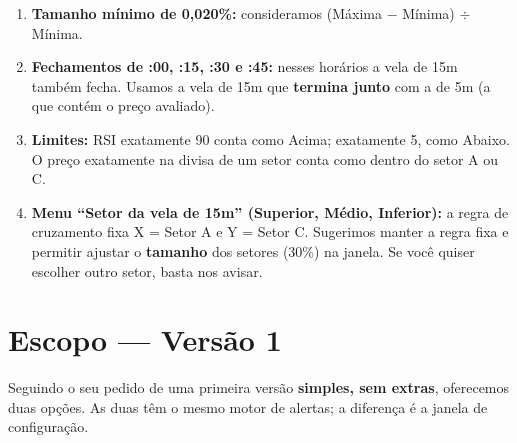 \documentclass[11pt,a4paper]{article}
\begin{document}
\begin{tcolorbox}[ajuste, title={4.5 \enspace Definições a confirmar com você}]
  \small
  \begin{enumerate}[leftmargin=1.4em, itemsep=2pt, topsep=1pt, label=\textbf{\alph*)}]
    \item \textbf{Tamanho mínimo de 0,020\%:} consideramos (Máxima $-$ Mínima) $\div$ Mínima.
    \item \textbf{Fechamentos de :00, :15, :30 e :45:} nesses horários a vela de 15m também fecha.
      Usamos a vela de 15m que \textbf{termina junto} com a de 5m (a que contém o preço avaliado).
    \item \textbf{Limites:} RSI exatamente 90 conta como Acima; exatamente 5, como Abaixo. O
      preço exatamente na divisa de um setor conta como dentro do setor A ou C.
    \item \textbf{Menu ``Setor da vela de 15m'' (Superior, Médio, Inferior):} a regra de cruzamento
      fixa X = Setor A e Y = Setor C. Sugerimos manter a regra fixa e permitir ajustar o
      \textbf{tamanho} dos setores (30\%) na janela. Se você quiser escolher outro setor, basta nos avisar.
  \end{enumerate}
\end{tcolorbox}

\section{Escopo --- Versão 1}

Seguindo o seu pedido de uma primeira versão \textbf{simples, sem extras}, oferecemos duas
opções. As duas têm o mesmo motor de alertas; a diferença é a janela de configuração.
\end{document}
